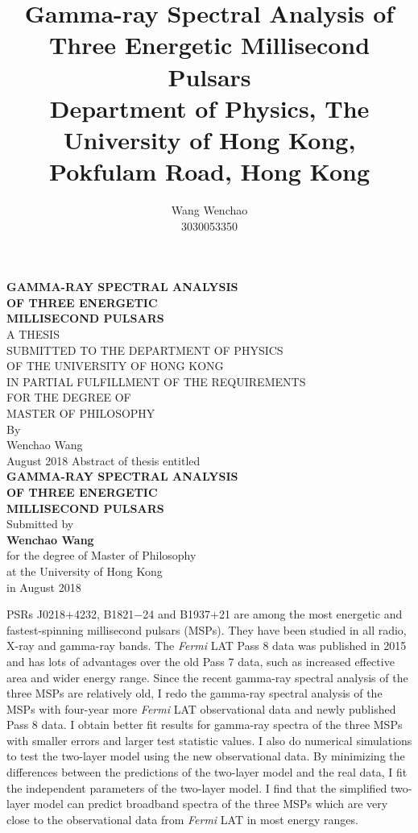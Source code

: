 \documentclass[a4paper, 12pt]{report}
\title{\textbf{Gamma-ray Spectral Analysis of Three Energetic Millisecond Pulsars} \\ \vspace{1cm}
  {\large Department of Physics, The University of Hong Kong, Pokfulam Road, Hong Kong}}
\date{}
\author{Wang Wenchao  \\3030053350}
\begin{document}
\begin{titlepage}
  \begin{center}
  \vspace*{3cm}
  \Large \textbf{GAMMA-RAY SPECTRAL ANALYSIS 
    \\[0.5cm] OF THREE ENERGETIC \\ [0.5cm] 
    MILLISECOND PULSARS \\[3.7cm]}
  \small
    A THESIS \\[0.5cm] 
    SUBMITTED TO THE DEPARTMENT OF PHYSICS \\[0.5cm]
    OF THE UNIVERSITY OF HONG KONG \\[0.5CM]
    IN PARTIAL FULFILLMENT OF THE REQUIREMENTS \\[0.5cm]
    FOR THE DEGREE OF \\[0.5cm]
    MASTER OF PHILOSOPHY \\[4.2cm]

    By \\[0.5cm]
    \large Wenchao Wang \\[0.5cm]
    August 2018
    \newpage 
    \centering 
    Abstract of thesis entitled \\[1.2cm]
    \Large \textbf{GAMMA-RAY SPECTRAL ANALYSIS 
    \\[0.5cm] OF THREE ENERGETIC \\ [0.5cm] 
    MILLISECOND PULSARS \\[0.5cm]}
    \normalsize Submitted by \\ [0.5cm]
    \Large \textbf{Wenchao Wang} \\[1cm]
    \normalsize for the degree of Master of Philosophy \\[0.5cm]
    at the University of Hong Kong \\[0.5cm]
    in August 2018 \\[1.9cm]
  \end{center}

    \doublespacing
    PSRs J0218+4232, B1821$-$24 and B1937+21 are among the most energetic and fastest-spinning 
    millisecond pulsars (MSPs). They have been studied in all radio, X-ray and gamma-ray bands. 
    The \textit{Fermi} LAT Pass 8 data was published in 2015 and has lots of advantages over 
    the old Pass 7 data, such as increased effective area and wider energy range. Since 
    the recent gamma-ray spectral analysis of the three MSPs are relatively old, 
    I redo the gamma-ray spectral analysis of the MSPs with 
    four-year more \textit{Fermi} LAT observational data and newly published Pass 8 data. 
    I obtain better fit results for gamma-ray spectra of the three MSPs with smaller errors 
    and larger test statistic values. I also do numerical simulations to test the 
    two-layer model using the new observational data. By minimizing the differences between 
    the predictions of the two-layer model and the real data, I fit the independent 
    parameters of the two-layer model. I find that the simplified two-layer model can 
    predict broadband spectra of the three MSPs which are very close to the observational data 
    from \textit{Fermi} LAT in most energy ranges.
    


\end{titlepage}
\end{document}
